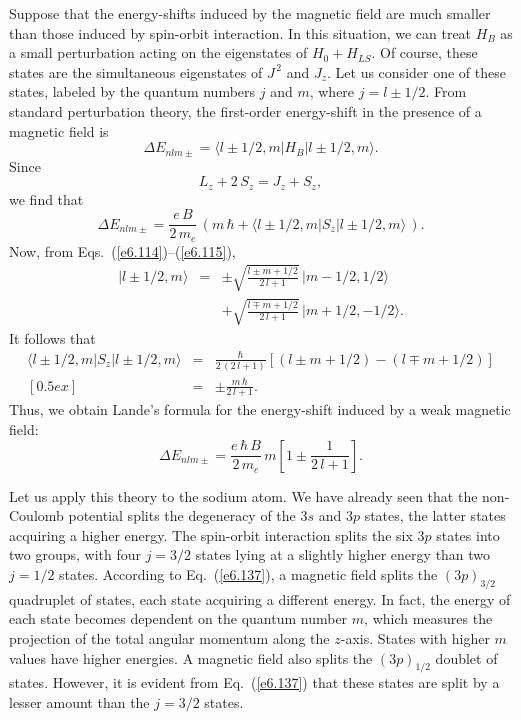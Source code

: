 Suppose that the energy-shifts induced by  the magnetic field are much smaller
than those  induced by spin-orbit interaction. In this situation,
we can treat $H_B$ as a small perturbation acting on the 
eigenstates of $H_0 + H_{LS}$. 
Of course, these states are the 
simultaneous eigenstates of $J^{\,2}$ and $J_z$. Let us consider one
of these states, labeled by the quantum numbers $j$ and $m$, where $j=l\pm 1/2$.   
From  standard perturbation theory, the first-order energy-shift 
in the presence of a  magnetic field is
\begin{equation}
\Delta E_{nlm\pm} = \langle l\pm 1/2, m| H_B | l\pm 1/2, m\rangle.
\end{equation}
Since
\begin{equation}
L_z + 2 \,S_z = J_z + S_z,
\end{equation}
we find that
\begin{equation}
\Delta E_{nlm\pm} = \frac{e\, B}{2 \,m_e}\, \left(m\,\hbar + \langle  
l\pm 1/2, m| S_z| l\pm 1/2, m\rangle\,
\right).
\end{equation}
Now, from Eqs.~(\ref{e6.114})--(\ref{e6.115}),
\begin{eqnarray}
|l\pm 1/2, m\rangle &=& \pm \sqrt{\frac{l\pm m +1/2}{2\,l+1}}\,
|m-1/2, 1/2\rangle\nonumber\\[0.5ex]
&&+\sqrt{\frac{l\mp m+1/2}{2\,l+1}}\, |m+1/2, -1/2\rangle.
\end{eqnarray}
It follows that
\begin{eqnarray}
 \langle  
l\pm 1/2, m| S_z| l\pm 1/2, m\rangle &=& \frac{\hbar}{2\,(2\,l+1)}
\left[(l\pm m+1/2) - (l\mp m + 1/2) \right] \nonumber \\ [0.5ex]
&=& \pm \frac{m\,\hbar}{2\,l+1}.
\end{eqnarray}
Thus, we obtain Lande's formula for the energy-shift induced by  a
weak magnetic field:
\begin{equation}\label{e6.137}
\Delta E_{nlm\pm} = \frac{e\, \hbar\, B}{2\, m_e}\,m \left[ 1 \pm \frac{1}{2\,l+1}
\right].
\end{equation}

Let us apply this theory to the sodium atom. We have already seen that
the non-Coulomb potential splits the degeneracy of the $3s$ and $3p$ states,
the latter states acquiring  a  higher energy. The spin-orbit interaction
splits the six $3p$ states into two groups, with four $j=3/2$ states
lying at a slightly higher energy than two $j=1/2$ states. According to
Eq.~(\ref{e6.137}), a magnetic field splits the $(3p)_{3/2}$ quadruplet of states,
each state acquiring a different energy. In fact, the energy of  each state
becomes  dependent  on the quantum number $m$, which measures the
projection of the total angular momentum along the $z$-axis. States with
higher $m$ values have higher energies. 
A magnetic field also splits the $(3p)_{1/2}$ doublet of states. However,
it is evident from Eq.~(\ref{e6.137}) that these states are split by a lesser
amount than the $j=3/2$ states. 


